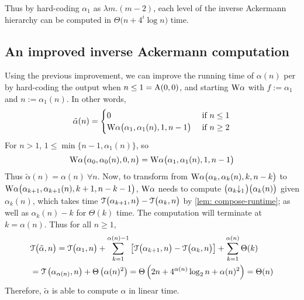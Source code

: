 Thus by hard-coding $\alpha_1$ as $\lambda m.(m-2)$, each level of the inverse Ackermann hierarchy can be computed in $\Theta\big(n + 4^i\log n\big)$ time.

\subsection{An improved inverse Ackermann computation}
Using the previous improvement, we can improve the running time of $\alpha(n)$ per  by hard-coding the output when $n\le 1 = \text{A}(0, 0)$, and starting $\text{W}\alpha$ with $f := \alpha_1$ and $n := \alpha_1(n)$. In other words,
\begin{equation*}
\tilde{\alpha}(n) = \begin{cases}
0 & \text{ if } n \le 1 \\ \text{W}\alpha\big(\alpha_1, \alpha_1(n), 1, n-1\big) & \text{ if } n \ge 2
\end{cases}
\end{equation*}
For $n > 1$, $1\le \min\big\{n-1, \alpha_1(n)\big\}$, so
\begin{equation*}
\text{W}\alpha\big(\alpha_0, \alpha_0(n), 0, n\big) =
\text{W}\alpha\big(\alpha_1, \alpha_1(n), 1, n-1\big)
\end{equation*}
Thus $\tilde{\alpha}(n) = \alpha(n) \ \forall n$. Now, to transform from $\text{W}\alpha\big(\alpha_k, \alpha_k(n), k, n-k\big)$ to $\text{W}\alpha\big(\alpha_{k+1}, \alpha_{k+1}(n), k+1, n-k-1\big)$, $\text{W}\alpha$ needs to compute $\big(\cdt{\alpha_k}{1}\big)\big(\alpha_k(n)\big)$ given $\alpha_k(n)$, which takes time $\mathcal{T}\big(\alpha_{k+1}, n\big) - \mathcal{T}\big(\alpha_k, n\big)$ by \cref{lem: compose-runtime}; as well as $\alpha_k(n) - k$ for $\Theta(k)$ time. The computation will terminate at $k = \alpha(n)$. Thus for all $n\ge 1$,
\begin{equation*}
\begin{aligned}
& \mathcal{T}\big(\tilde{\alpha}, n\big) = \mathcal{T}\big(\alpha_1, n\big) + \sum_{k=1}^{\alpha(n) - 1}
\left[ \mathcal{T}\big(\alpha_{k+1}, n\big) - \mathcal{T}\big(\alpha_k, n\big)
\right] + \sum_{k=1}^{\alpha(n)}\Theta(k) \\
& = \mathcal{T}\left(\alpha_{\alpha(n)}, n\right) + \Theta\left(\alpha(n)^2\right)
= \Theta\left(2n + 4^{\alpha(n)}\log_2n + \alpha(n)^2\right) = \Theta(n)
\end{aligned}
\end{equation*}
Therefore, $\tilde{\alpha}$ is able to compute $\alpha$ in linear time.
